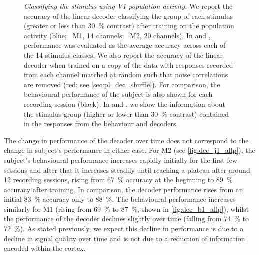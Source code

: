 \begin{figure}[htbp]
{    }
    \hspace*{\fill}
    \caption{%
    \textit{Classifying the stimulus using \ac{V1} population activity.}
    We report the accuracy of the linear decoder classifying the group of each stimulus (greater or less than \SI{30}{\percent} contrast) after training on the population activity (blue; \protect{}~\ac{M1}, \num{14} channels; \protect{}~\ac{M2}, \num{20} channels).
    In \protect{} and \protect{}, performance was evaluated as the average accuracy across each of the \num{14} stimulus classes.
    We also report the accuracy of the linear decoder when trained on a copy of the data with responses recorded from each channel matched at random such that noise correlations are removed (red; see \autoref{sec:pl_dec_shuffle}).
    For comparison, the behavioural performance of the subject is also shown for each recording session (black).
    In \protect{} and \protect{}, we show the information about the stimulus group (higher or lower than \SI{30}{\percent} contrast) contained in the responses from the behaviour and decoders.
}
    \label{fig:dec_all_v1}
\end{figure}

The change in performance of the decoder over time does not correspond to the change in subject's performance in either case.
For \ac{M2} (see \autoref{fig:dec_j1_allp}), the subject's behavioural performance increases rapidly initially for the first few sessions and after that it increases steadily until reaching a plateau after around \num{12} recording sessions, rising from \SI{67}{\percent} accuracy at the beginning to \SI{89}{\percent} accuracy after training.
In comparison, the decoder performance rises from an initial \SI{83}{\percent} accuracy only to \SI{88}{\percent}.
The behavioural performance increases similarly for \ac{M1} (rising from \SI{69}{\percent} to \SI{87}{\percent}, shown in \autoref{fig:dec_b1_allp}), whilst the performance of the decoder declines slightly over time (falling from \SI{74}{\percent} to \SI{72}{\percent}).
As stated previously, we expect this decline in performance is due to a decline in signal quality over time and is not due to a reduction of information encoded within the cortex.

